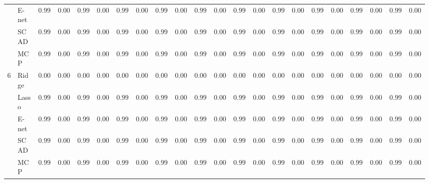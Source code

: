 \begin{tabular}{ll|ll|llllll|llllll|llllll}
 & E-net  & $0.9972$ & $0.0025$ & $0.9958$ & $0.0030$ & $0.9955$ & $0.0030$ & $0.9924$ & $0.0023$ & $0.9973$ & $0.0026$ & $0.9986$ & $0.0022$ & $0.9987$ & $0.0027$ & $0.9971$ & $0.0026$ & $0.9983$ & $0.0029$ & $0.9969$ & $0.0017$ \\
 & SCAD  & $0.9972$ & $0.0033$ & $0.9972$ & $0.0026$ & $0.9982$ & $0.0021$ & $0.9989$ & $0.0021$ & $0.9971$ & $0.0031$ & $0.9960$ & $0.0032$ & $0.9985$ & $0.0028$ & $0.9970$ & $0.0031$ & $0.9973$ & $0.0025$ & $0.9990$ & $0.0019$ \\
 & MCP  & $0.9993$ & $0.0010$ & $0.9994$ & $0.0008$ & $0.9996$ & $0.0006$ & $0.9998$ & $0.0004$ & $0.9994$ & $0.0009$ & $0.9988$ & $0.0015$ & $0.9995$ & $0.0009$ & $0.9995$ & $0.0008$ & $0.9996$ & $0.0008$ & $0.9996$ & $0.0008$ \\\hline
6 & Ridge  & $0.0000$ & $0.0000$ & $0.0000$ & $0.0000$ & $0.0000$ & $0.0000$ & $0.0000$ & $0.0000$ & $0.0000$ & $0.0000$ & $0.0000$ & $0.0000$ & $0.0000$ & $0.0000$ & $0.0000$ & $0.0000$ & $0.0000$ & $0.0000$ & $0.0000$ & $0.0000$ \\
 & Lasso  & $0.9976$ & $0.0023$ & $0.9962$ & $0.0029$ & $0.9964$ & $0.0030$ & $0.9958$ & $0.0020$ & $0.9976$ & $0.0027$ & $0.9987$ & $0.0021$ & $0.9994$ & $0.0014$ & $0.9972$ & $0.0028$ & $0.9984$ & $0.0030$ & $0.9987$ & $0.0013$ \\
 & E-net  & $0.9972$ & $0.0025$ & $0.9958$ & $0.0030$ & $0.9955$ & $0.0030$ & $0.9924$ & $0.0023$ & $0.9975$ & $0.0023$ & $0.9986$ & $0.0022$ & $0.9987$ & $0.0027$ & $0.9971$ & $0.0026$ & $0.9983$ & $0.0029$ & $0.9969$ & $0.0017$ \\
 & SCAD  & $0.9972$ & $0.0033$ & $0.9972$ & $0.0026$ & $0.9982$ & $0.0021$ & $0.9989$ & $0.0021$ & $0.9971$ & $0.0029$ & $0.9960$ & $0.0032$ & $0.9985$ & $0.0028$ & $0.9970$ & $0.0031$ & $0.9973$ & $0.0025$ & $0.9990$ & $0.0019$ \\
 & MCP  & $0.9993$ & $0.0010$ & $0.9994$ & $0.0008$ & $0.9996$ & $0.0006$ & $0.9998$ & $0.0004$ & $0.9994$ & $0.0009$ & $0.9988$ & $0.0015$ & $0.9995$ & $0.0009$ & $0.9995$ & $0.0008$ & $0.9996$ & $0.0008$ & $0.9996$ & $0.0008$ \\
\hline 
\end{tabular}

